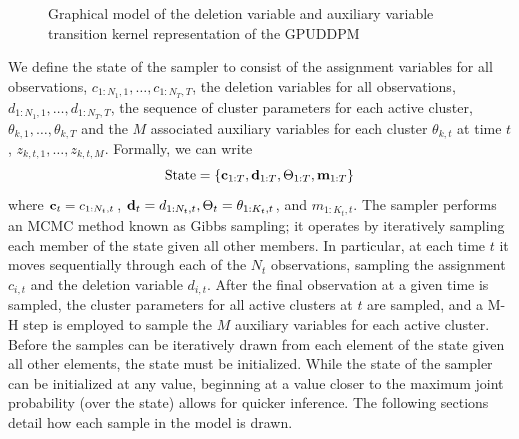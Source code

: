 \documentclass[twocolumn, final]{svjour3}
\begin{document}
\begin{figure}[h]
        \caption{Graphical model of the deletion variable and auxiliary variable transition kernel representation of the GPUDDPM}
        \label{fig:gpuddpm_gm_2}
\end{figure}

We define the state of the sampler to consist of the assignment variables for all observations, $c_{1:N_{1},1}, \ldots, c_{1:N_{T}, T}$, the deletion variables for all observations, $d_{1:N_{1},1}, \ldots, d_{1:N_{T}, T}$, the sequence of cluster parameters for each active cluster, $\theta_{k,1}, \ldots, \theta_{k, T}$ and the $M$ associated auxiliary variables for each cluster $\theta_{k,t}$ at time $t$, $z_{k,t,1}, \ldots, z_{k, t, M}$. Formally, we can write
\begin{equation}
\text{State} = \{ \bold{c}_{1:T}, \bold{d}_{1:T}, \Theta_{1:T}, \bold{m}_{1:T} \}
\end{equation}
where $\bold{c}_{t} = c_{1:N_{t},t}$, $\bold{d}_{t} = d_{1:N_{t},t}, \Theta_{t} = \theta_{1:K_{t}, t}$, and $m_{1:K_{t},t}$.
The sampler performs an MCMC method known as Gibbs sampling; it operates by iteratively sampling each member of the state given all other members. In particular, at each time $t$ it moves sequentially through each of the $N_{t}$ observations, sampling the assignment $c_{i,t}$ and the deletion variable $d_{i,t}$. After the final observation at a given time is sampled, the cluster parameters for all active clusters at $t$ are sampled, and a M-H step is employed to sample the $M$ auxiliary variables for each active cluster. Before the samples can be iteratively drawn from each element of the state given all other elements, the state must be initialized. While the state of the sampler can be initialized at any value, beginning at a value closer to the maximum joint probability (over the state) allows for quicker inference. The following sections detail how each sample in the model is drawn.
\end{document}
